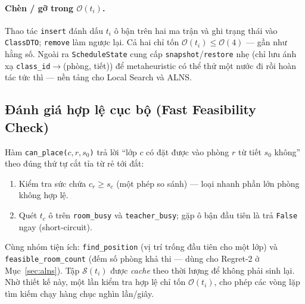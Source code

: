 \paragraph{Chèn / gỡ trong $\mathcal{O}(t_i)$.} Thao tác \texttt{insert} đánh dấu
$t_i$ ô bận trên hai ma trận và ghi trạng thái vào \texttt{ClassDTO}; \texttt{remove}
làm ngược lại. Cả hai chỉ tốn $\mathcal{O}(t_i)\le\mathcal{O}(4)$ --- gần như hằng
số. Ngoài ra \texttt{ScheduleState} cung cấp \texttt{snapshot}/\texttt{restore}
nhẹ (chỉ lưu ánh xạ \texttt{class\_id}$\to$(phòng, tiết)) để metaheuristic có thể
thử một nước đi rồi hoàn tác tức thì --- nền tảng cho Local Search và ALNS.

\subsection{Đánh giá hợp lệ cục bộ (Fast Feasibility Check)}
Hàm \texttt{can\_place($c,r,s_0$)} trả lời ``lớp $c$ có đặt được vào phòng $r$ từ
tiết $s_0$ không'' theo đúng thứ tự cắt tỉa từ rẻ tới đắt:
\begin{enumerate}[leftmargin=*]
  \item Kiểm tra sức chứa $c_r \ge s_c$ (một phép so sánh) --- loại nhanh phần lớn
  phòng không hợp lệ.
  \item Quét $t_c$ ô trên \texttt{room\_busy} và \texttt{teacher\_busy}; gặp ô bận
  đầu tiên là trả \texttt{False} ngay (short-circuit).
\end{enumerate}
Cùng nhóm tiện ích: \texttt{find\_position} (vị trí trống đầu tiên cho một lớp) và
\texttt{feasible\_room\_count} (đếm số phòng khả thi --- dùng cho Regret-2 ở
Mục~\ref{sec:alns}). Tập $\mathcal{S}(t_i)$ được \emph{cache} theo thời lượng để
không phải sinh lại. Nhờ thiết kế này, một lần kiểm tra hợp lệ chỉ tốn
$\mathcal{O}(t_i)$, cho phép các vòng lặp tìm kiếm chạy hàng chục nghìn lần/giây.
